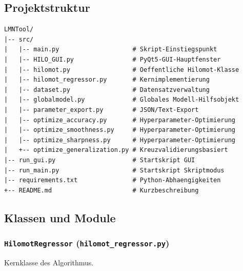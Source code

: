 \documentclass[12pt,a4paper]{article}
\begin{document}
\subsection{Projektstruktur}

\begin{lstlisting}[caption={Verzeichnisstruktur des LMNTool-Projekts},language={}
]
LMNTool/
|-- src/
|   |-- main.py                    # Skript-Einstiegspunkt
|   |-- HILO_GUI.py                # PyQt5-GUI-Hauptfenster
|   |-- hilomot.py                 # Oeffentliche Hilomot-Klasse
|   |-- hilomot_regressor.py       # Kernimplementierung
|   |-- dataset.py                 # Datensatzverwaltung
|   |-- globalmodel.py             # Globales Modell-Hilfsobjekt
|   |-- parameter_export.py        # JSON/Text-Export
|   |-- optimize_accuracy.py       # Hyperparameter-Optimierung
|   |-- optimize_smoothness.py     # Hyperparameter-Optimierung
|   |-- optimize_sharpness.py      # Hyperparameter-Optimierung
|   +-- optimize_generalization.py # Kreuzvalidierungsbasiert
|-- run_gui.py                     # Startskript GUI
|-- run_main.py                    # Startskript Skriptmodus
|-- requirements.txt               # Python-Abhaengigkeiten
+-- README.md                      # Kurzbeschreibung
\end{lstlisting}

\subsection{Klassen und Module}

\subsubsection*{\texttt{HilomotRegressor} (\texttt{hilomot\_regressor.py})}

Kernklasse des Algorithmus.
\end{document}
